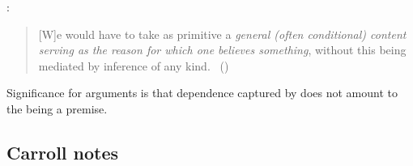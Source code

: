 \begin{note}
  \citeauthor{Boghossian:2008vf}:
  \begin{quote}
    [W]e would have to take as primitive a \emph{general (often conditional) content serving as the reason for which one believes something}, without this being mediated by inference of any kind.%
    \mbox{ }\hfill\mbox{(\citeyear[500]{Boghossian:2008vf})}
  \end{quote}
\end{note}

\begin{note}
  Significance for arguments is that dependence captured by \qWhyV{} does not amount to the \ros{} being a premise.
\end{note}

\subsection{Carroll notes}

